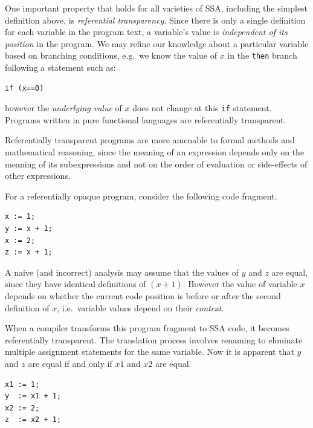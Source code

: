 
One important property that holds for all varieties of SSA,
including the simplest definition above, is 
\emph{referential transparency}.
Since there is only a single definition for each variable
in the program text, a variable's value
is \textit{independent of
its position} in the program.
We may refine our knowledge about a particular variable
based on branching conditions, e.g.\ we know the value of $x$ in the
\texttt{then} branch following a statement such as:
\begin{verbatim}
if (x==0)
\end{verbatim}
however the
\textit{underlying value} of $x$
does not change at this \texttt{if} statement.
Programs written in pure functional languages
are referentially transparent.

Referentially transparent programs are more amenable to 
formal methods and mathematical reasoning, since
the meaning of an expression depends only on the
meaning of its subexpressions
and not on the order of evaluation or
side-effects of other expressions.

For a referentially opaque program, consider
the following code fragment.
\begin{verbatim}
x := 1;
y := x + 1;
x := 2;
z := x + 1;
\end{verbatim}
A naive (and incorrect) analysis may assume that the values
of $y$ and $z$ are equal, since they have identical 
definitions of $(x+1)$. 
However the value of variable $x$ depends on whether
the current code position is before or after the second definition
of $x$, i.e.\ variable values depend on their \textit{context}.

When a compiler transforms this program fragment to SSA code,
it becomes referentially transparent. The translation process
involves renaming to  
eliminate multiple assignment statements for the same variable.
Now it is
apparent that $y$ and $z$ are equal if and only if $x1$ and $x2$
are equal.
\begin{verbatim}
x1 := 1;
y  := x1 + 1;
x2 := 2;
z  := x2 + 1;
\end{verbatim}




